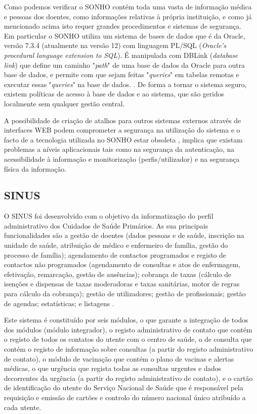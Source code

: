 \documentclass[conference]{IEEEtran}
\begin{document}
Como podemos verificar o SONHO contém toda uma vasta de informação médica e pessoas dos doentes, como informações relativas à própria instituição, e como já mencionado acima isto requer grandes procedimentos e sistemas de segurança. Em particular o SONHO utiliza um sistema de bases de dados que é da Oracle, versão 7.3.4 (atualmente na versão 12) com linguagem PL/SQL (\textit{Oracle’s procedural language extension to SQL}). É manipulada com DBLink (\textit{database link}) que define um caminho "\textit{path}" de uma base de dados da Oracle para outra base de dados, e permite com que sejam feitas "\textit{queries}" em tabelas remotas e executar essas "\textit{queries}" na base de dados. \cite{sonho}. De forma a tornar o sistema seguro, existem políticas de acesso à base de dados e ao sistema, que são geridos localmente sem qualquer gestão central. 

A possibilidade de criação de atalhos para outros sistemas externos através de interfaces WEB podem comprometer a segurança na utilização do sistema e o facto de a tecnologia utilizada no SONHO estar obsoleta \cite{sonho}, implica que existam problemas a níveis aplicacionais tais como na segurança da autenticação, na acessibilidade à informação e monitorização (perfis/utilizador) e na segurança física da informação.


\subsection{SINUS}

O SINUS foi desenvolvido com o objetivo da informatização do perfil administrativo dos Cuidados de Saúde Primários. As sua principais funcionalidades são a gestão de doentes (dados pessoas e de saúde, inscrição na unidade de saúde, atribuição de médico e enfermeiro de família, gestão do processo de família); agendamento de contactos programados e registo de contactos não programados (agendamento de consultas e atos de enfermagem, efetivação, remarcação, gestão de ausências); cobrança de taxas (cálculo de isenções e dispensas de taxas moderadoras e taxas sanitárias, motor de regras para cálculo da cobrança); gestão de utilizadores; gestão de profissionais; gestão de agendas; estatísticas; e listagens \cite{sinus}.

Este sistema é constituído por seis módulos, o que garante a integração de todos dos módulos (módulo integrador), o registo administrativo de contato que contém o registo de todos os contatos do utente com o centro de saúde, o de consulta que contém o registo de informação sobre consultas (a partir do registo administrativo de contato), o módulo de vacinação que contém o plano de vacinas e alertas médicas, o que urgência que regista todas as consultas urgentes e dados decorrentes da urgência (a partir do registo administrativo de contato), e o cartão de identificação do utente do Serviço Nacional de Saúde que é responsável  pela requisição e emissão de cartões e controlo do número nacional único atribuído a cada utente.
\end{document}
